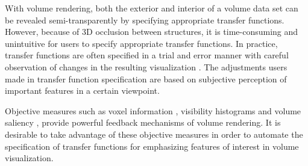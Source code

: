 With volume rendering, both the exterior and interior of a volume data set can be revealed semi-transparently by specifying appropriate transfer functions. However, because of 3D occlusion between structures, it is time-consuming and unintuitive for users to specify appropriate transfer functions. In practice, transfer functions are often specified in a trial and error manner with careful observation of changes in the resulting visualization \cite{kniss_interactive_2001}.
The adjustments users made in transfer function specification are based on subjective perception of important features in a certain viewpoint.

Objective measures such as voxel information \cite{bordoloi_view_2005} \cite{wang_information_2011}, visibility histograms \cite{emsenhuber_visibility_2008} \cite{correa_visibility-driven_2009} and volume saliency \cite{kim_saliency-guided_2006}, provide powerful feedback mechanisms of volume rendering. It is desirable to take advantage of these objective measures in order to automate the specification of transfer functions for emphasizing features of interest in volume visualization.

% 
%
%
 


